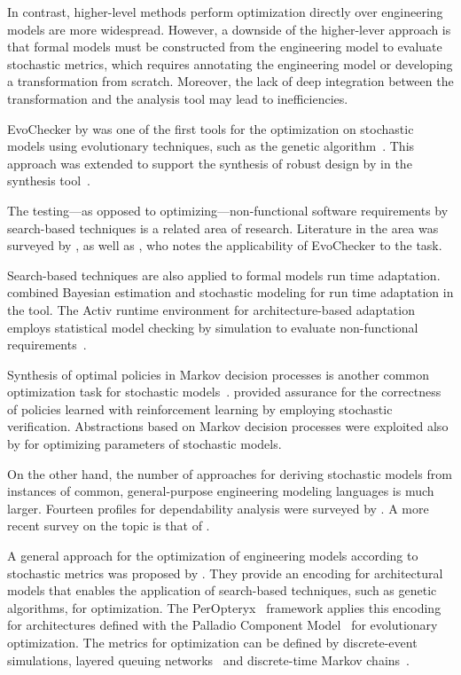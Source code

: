 In contrast, higher-level methods perform optimization directly over engineering models are more widespread. However, a downside of the higher-lever approach is that formal models must be constructed from the engineering model to evaluate stochastic metrics, which requires annotating the engineering model or developing a transformation from scratch. Moreover, the lack of deep integration between the transformation and the analysis tool may lead to inefficiencies.

EvoChecker by \citet{Gerasimou15evochecker} was one of the first tools for the optimization on stochastic models using evolutionary techniques, such as the  genetic algorithm~\citep{Deb02nsga}. This approach was extended to support the synthesis of robust design by \citet{Calinescu17robust} in the  synthesis tool~\citep{Calinescu17rodes}.

The testing---as opposed to optimizing---non-functional software requirements by search-based techniques is a related area of research. Literature in the area was surveyed by \citet{Afzal09testing}, as well as \citet{Parasa16testing}, who notes the applicability of EvoChecker to the task.

Search-based techniques are also applied to formal models run time adaptation. \citet{Epifani09adaptation} combined Bayesian estimation and stochastic modeling for run time adaptation in the  tool. The Activ runtime environment for architecture-based adaptation employs statistical model checking by simulation to evaluate non-functional requirements~\citep{Iftikhar17activforms}.

Synthesis of optimal policies in Markov decision processes is another common optimization task for stochastic models~\citep{Baier17maximizing}. \citet{Mason17assurance} provided assurance for the correctness of policies learned with reinforcement learning by employing stochastic verification. Abstractions based on Markov decision processes were exploited also by \citet{Quatmann16mdp} for optimizing parameters of stochastic models. 

On the other hand, the number of approaches for deriving stochastic models from instances of common,  general-purpose engineering modeling languages is much larger. Fourteen  profiles for dependability analysis were surveyed by \citet{Bernardi08umlprofile}. A more recent survey on the topic is that of \citet{Koziolek10review}.

A general approach for the optimization of engineering models according to stochastic metrics was proposed by \citet{Koziolek11generic}. They provide an encoding for architectural models that enables the application of search-based techniques, such as genetic algorithms, for optimization. The PerOpteryx~\citep{Martens10evolutionary} framework applies this encoding for architectures defined with the Palladio Component Model~\citep{Becker08palladio} for evolutionary optimization. The metrics for optimization can be defined by discrete-event simulations, layered queuing networks~\citep{Franks09lqn} and discrete-time Markov chains~\citep{Koziolek09dependencies}.

